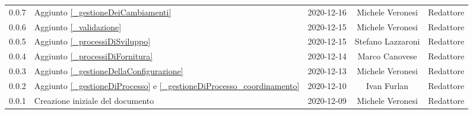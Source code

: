 \begin{center}
\begin{longtable}{|c|p{5cm}|c|c|c|}
		0.0.7 & Aggiunto \ref{_gestioneDeiCambiamenti} & 2020-12-16 & Michele Veronesi & Redattore \\
		0.0.6 & Aggiunto \ref{_validazione} & 2020-12-15 & Michele Veronesi & Redattore \\
		0.0.5 & Aggiunto \ref{_processiDiSviluppo} & 2020-12-15 & Stefano Lazzaroni & Redattore \\
		0.0.4 & Aggiunto \ref{_processiDiFornitura} & 2020-12-14 & Marco Canovese & Redattore \\
		0.0.3 & Aggiunto \ref{_gestioneDellaConfigurazione} & 2020-12-13 & Michele Veronesi & Redattore \\
		0.0.2 & Aggiunto \ref{_gestioneDiProcesso} e \ref{_gestioneDiProcesso_coordinamento} & 2020-12-10 & Ivan Furlan & Redattore \\
		0.0.1 & Creazione iniziale del documento & 2020-12-09 & Michele Veronesi & Redattore \\
		
		\hline
	\end{longtable}
\end{center}